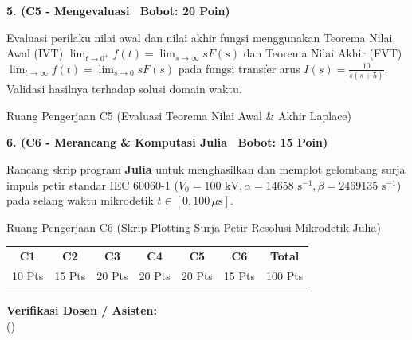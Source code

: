 \documentclass[10pt,a4paper]{article}
\begin{document}
\vspace{1.5mm}

\noindent\textbf{5. (C5 - Mengevaluasi \textbar\ Bobot: 20 Poin)}\par\vspace{0.5mm}
{\footnotesize Evaluasi perilaku nilai awal dan nilai akhir fungsi menggunakan Teorema Nilai Awal (IVT) $\lim_{t \to 0^+} f(t) = \lim_{s \to \infty} s F(s)$ dan Teorema Nilai Akhir (FVT) $\lim_{t \to \infty} f(t) = \lim_{s \to 0} s F(s)$ pada fungsi transfer arus $I(s) = \frac{10}{s(s+5)}$. Validasi hasilnya terhadap solusi domain waktu.}
\begin{answerbox}{Ruang Pengerjaan C5 (Evaluasi Teorema Nilai Awal \& Akhir Laplace)}
  \vspace{3.8cm}
\end{answerbox}

\vspace{1.5mm}

\noindent\textbf{6. (C6 - Merancang \& Komputasi Julia \textbar\ Bobot: 15 Poin)}\par\vspace{0.5mm}
{\footnotesize Rancang skrip program \textbf{Julia} untuk menghasilkan dan memplot gelombang surja impuls petir standar IEC 60060-1 ($V_0 = 100\text{ kV}, \alpha = 14658\text{ s}^{-1}, \beta = 2469135\text{ s}^{-1}$) pada selang waktu mikrodetik $t \in [0, 100\,\mu\text{s}]$.}
\begin{answerbox}{Ruang Pengerjaan C6 (Skrip Plotting Surja Petir Resolusi Mikrodetik Julia)}
  \vspace{3.8cm}
\end{answerbox}

\vspace{1.5mm}

\noindent\begin{minipage}[b]{0.65\textwidth}%
  \centering
  \scriptsize
  \begin{tabular}{|c|c|c|c|c|c|c|}
    \hline
    \rowcolor{unibblue}
    \textbf{\color{white}C1} & \textbf{\color{white}C2} & \textbf{\color{white}C3} & \textbf{\color{white}C4} & \textbf{\color{white}C5} & \textbf{\color{white}C6} & \textbf{\color{white}Total} \\
    \rowcolor{unibblue!10}
    10 Pts & 15 Pts & 20 Pts & 20 Pts & 20 Pts & 15 Pts & 100 Pts \\
    \hline
    & & & & & & \\[2.5mm]
    \hline
  \end{tabular}%
\end{minipage}%
\hfill%
\begin{minipage}[b]{0.32\textwidth}%
  \centering
  \scriptsize
  \textbf{Verifikasi Dosen / Asisten:}\\[5mm]
  (\dotfill)
\end{minipage}\par
\end{document}
